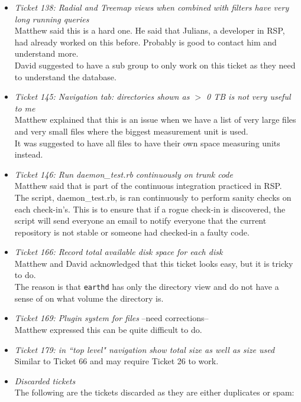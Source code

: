 \documentclass{letter}
\begin{document}
\begin{enumerate}
\begin{itemize}
	\item \textit{Ticket 138: Radial and Treemap views when combined with filters have very long running queries} \\
	Matthew said this is a hard one. He said that Julians, a developer in RSP, had already worked on this before. Probably is good to contact him and understand more. \\
	David suggested to have a sub group to only work on this ticket as they need to understand the database. 
	\item \textit{Ticket 145: Navigation tab: directories shown as $ > $ 0 TB is not very useful to me} \\
	Matthew explained that this is an issue when we have a list of very large files and very small files where the biggest measurement unit is used. \\
	It was suggested to have all files to have their own space measuring units instead.
	\item \textit{Ticket 146: Run daemon\_test.rb continuously on trunk code} \\
	Matthew said that is part of the continuous integration practiced in RSP. \\
	The script, daemon\_test.rb, is ran continuously to perform sanity checks on each check-in's. This is to ensure that if a rogue check-in is discovered, the script will send everyone an email to notify everyone that the current repository is not stable or someone had checked-in a faulty code. 
	\item \textit{Ticket 166: Record total available disk space for each disk} \\
	Matthew and David acknowledged that this ticket looks easy, but it is tricky to do. \\
	The reason is that \texttt{earthd} has only the directory view and do not have a sense of on what volume the directory is. 
	\item \textit{Ticket 169: Plugin system for files} --need corrections-- \\
	Matthew expressed this can be quite difficult to do. 
	\item \textit{Ticket 179: in ``top level" navigation show total size as well as size used} \\
	Similar to Ticket 66 and may require Ticket 26 to work. 
	\item \textit{Discarded tickets} \\
	The following are the tickets discarded as they are either duplicates or spam: 
		\begin{itemize}

\end{itemize}
\end{itemize}
\end{enumerate}
\end{document}
